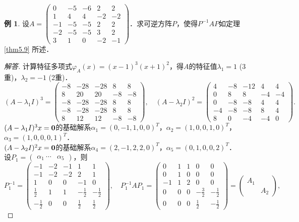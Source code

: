 \documentclass[a4paper,fontset=windows]{ctexbook}
\theoremstyle{definition}
\newtheorem{example}{例}[chapter]
\begin{document}
\begin{example}
设$A=\begin{pmatrix}0&-5&-6&2&2 \\ 1&4&4&-2&-2 \\ -1&-5&-5&2&2 \\ -2&-5&-5&3&2 \\ 3&1&0&-2&-1\end{pmatrix}$．求可逆方阵$P，$使得$P^{-1}AP$如定理\ref{thm5.9} 所述．
\end{example}

\begin{proof}[解答]
计算特征多项式$\varphi_A(x)=(x-1)^3(x+1)^2$，得$A$的特征值$\lambda_1=1$ (3重)，$\lambda_2=-1$ (2重)．
$$(A-\lambda_1I)^3=\begin{pmatrix}-8&-28&-28&8&8 \\ 8&20&20&-8&-8 \\ -8&-28&-28&8&8 \\ -8&-28&-28&8&8 \\ 8&12&12&-8&-8\end{pmatrix},\quad(A-\lambda_2I)^2=\begin{pmatrix}4&-8&-12&4&4 \\ 0&8&8&-4&-4 \\ 0&-8&-8&4&4 \\ -4&-8&-8&8&4 \\ 8&0&-4&-4&0\end{pmatrix}.$$
$(A-\lambda_1I)^3x={\bf 0}$的基础解系$\alpha_1=(0,-1,1,0,0)^T$，$\alpha_2=(1,0,0,1,0)^T$，$\alpha_3=(1,0,0,0,1)^T$．\\
$(A-\lambda_2I)^2x={\bf 0}$的基础解系$\alpha_4=(2,-1,2,2,0)^T$，$\alpha_5=(0,1,0,0,2)^T$．\\
设$P_1=\begin{pmatrix}\alpha_1~\cdots&\alpha_5\end{pmatrix}$，则
$$P_1^{-1}=\begin{pmatrix}-1&-2&-1&1&1 \\ -1&-2&-2&2&1 \\ 1&0&0&-1&0 \\ \frac{1}{2}&1&1&-\frac{1}{2}&-\frac{1}{2} \\ -\frac{1}{2}&0&0&\frac{1}{2}&\frac{1}{2}\end{pmatrix},\quad
P_1^{-1}AP_1=\begin{pmatrix}0&1&1&0&0 \\ 0&1&0&0&0 \\ -1&1&2&0&0 \\ 0&0&0&-\frac{3}{2}&-\frac{1}{2} \\ 0&0&0&\frac{1}{2}&-\frac{1}{2}\end{pmatrix}=\begin{pmatrix}A_1& \\ &A_2\end{pmatrix},$$

\end{proof}
\end{document}
